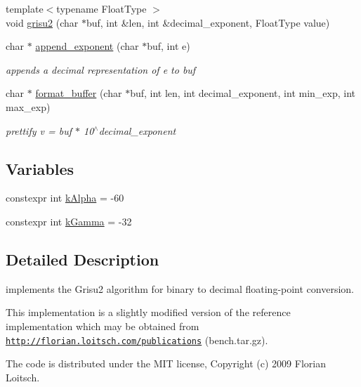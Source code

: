 \begin{DoxyCompactItemize}
\item 
{\footnotesize template$<$typename Float\+Type $>$ }\\void \hyperlink{namespacenlohmann_1_1detail_1_1dtoa__impl_aab7a9670a4f4704a5d0347ad7588576b}{grisu2} (char $\ast$buf, int \&len, int \&decimal\+\_\+exponent, Float\+Type value)
\item 
char $\ast$ \hyperlink{namespacenlohmann_1_1detail_1_1dtoa__impl_a84733638b826eda624488f5fa4521e0b}{append\+\_\+exponent} (char $\ast$buf, int e)
\begin{DoxyCompactList}\small\item\em appends a decimal representation of e to buf \end{DoxyCompactList}\item 
char $\ast$ \hyperlink{namespacenlohmann_1_1detail_1_1dtoa__impl_a12c1c5d8b46ba9702186445e73f86afe}{format\+\_\+buffer} (char $\ast$buf, int len, int decimal\+\_\+exponent, int min\+\_\+exp, int max\+\_\+exp)
\begin{DoxyCompactList}\small\item\em prettify v = buf $\ast$ 10$^\wedge$decimal\+\_\+exponent \end{DoxyCompactList}\end{DoxyCompactItemize}
\subsection*{Variables}
\begin{DoxyCompactItemize}
\item 
constexpr int \hyperlink{namespacenlohmann_1_1detail_1_1dtoa__impl_ac1ea1316de0b4a219f707c76b1db1966}{k\+Alpha} = -\/60
\item 
constexpr int \hyperlink{namespacenlohmann_1_1detail_1_1dtoa__impl_a4a750fcc38da1ce68b7e25ab3a230e20}{k\+Gamma} = -\/32
\end{DoxyCompactItemize}


\subsection{Detailed Description}
implements the Grisu2 algorithm for binary to decimal floating-\/point conversion. 

This implementation is a slightly modified version of the reference implementation which may be obtained from \href{http://florian.loitsch.com/publications}{\tt http\+://florian.\+loitsch.\+com/publications} (bench.\+tar.\+gz).

The code is distributed under the M\+IT license, Copyright (c) 2009 Florian Loitsch.

